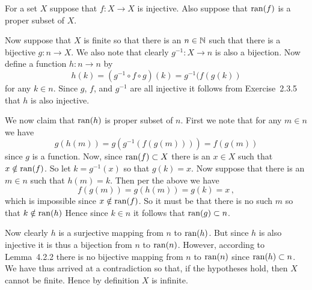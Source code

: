 \begin{solution}
	For a set $X$ suppose that $f : X \to X$ is injective.
    Also suppose that $\mathrm{ran}(f)$ is a proper subset of $X$.

    Now suppose that $X$ is finite so that there is an $n \in \mathbb{N}$ such that there is a bijective $g : n \to X$.
    We also note that clearly $g^{-1} : X \to n$ is also a bijection.
    Now define a function $h : n \to n$ by
    $$
    h(k) = (g^{-1} \circ f \circ g)(k) = g^{-1}(f(g(k))
    $$
    for any $k \in n$.
    Since $g$, $f$, and $g^{-1}$ are all injective it follows from Exercise~2.3.5 that $h$ is also injective.

    We now claim that $\mathrm{ran}(h)$ is proper subset of $n$.
    First we note that for any $m \in n$ we have
    $$
    g(h(m)) = g(g^{-1}(f(g(m)))) = f(g(m))
    $$
    since $g$ is a function.
    Now, since $\mathrm{ran}(f) \subset X$ there is an $x \in X$ such that $x \notin \mathrm{ran}(f)$.
    So let $k = g^{-1}(x)$ so that $g(k) = x$.
    Now suppose that there is an $m \in n$ such that $h(m) = k$.
    Then per the above we have
    $$
    f(g(m)) = g(h(m)) = g(k) = x \,,
    $$
    which is impossible since $x \notin \mathrm{ran}(f)$.
    So it must be that there is no such $m$ so that $k \notin \mathrm{ran}(h)$
    Hence since $k \in n$ it follows that $\mathrm{ran}(g) \subset n$.

    Now clearly $h$ is a surjective mapping from $n$ to $\mathrm{ran}(h)$.
    But since $h$ is also injective it is thus a bijection from $n$ to $\mathrm{ran}(n)$.
    However, according to Lemma~4.2.2 there is no bijective mapping from $n$ to $\mathrm{ran}(n)$ since $\mathrm{ran}(h) \subset n$.
    We have thus arrived at a contradiction so that, if the hypotheses hold, then $X$ cannot be finite.
    Hence by definition $X$ is infinite.
\end{solution}


